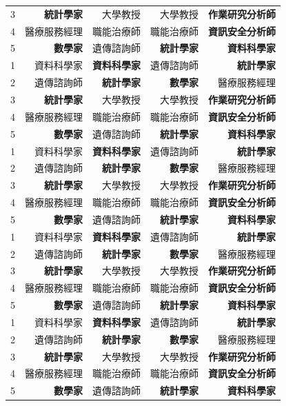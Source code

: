 \documentclass[utf8,12pt]{article} %
\begin{document}
\begin{longtable}{@{}crrrr@{}}
3 & \textbf{統計學家} & 大學教授  & 大學教授 & \textbf{作業研究分析師}\\
4 & 醫療服務經理 & 職能治療師  & 職能治療師 & \textbf{資訊安全分析師} \\
5 & \textbf{數學家} & 遺傳諮詢師 & \textbf{統計學家} & \textbf{資料科學家} \\
1 & { 資料科學家} & \textbf{資料科學家}  &  遺傳諮詢師 & \textbf{統計學家} \\
2 & 遺傳諮詢師 & \textbf{統計學家} & \textbf{數學家}  & 醫療服務經理 \\
3 & \textbf{統計學家} & 大學教授  & 大學教授 & \textbf{作業研究分析師}\\
4 & 醫療服務經理 & 職能治療師  & 職能治療師 & \textbf{資訊安全分析師} \\
5 & \textbf{數學家} & 遺傳諮詢師 & \textbf{統計學家} & \textbf{資料科學家} \\
1 & { 資料科學家} & \textbf{資料科學家}  &  遺傳諮詢師 & \textbf{統計學家} \\
2 & 遺傳諮詢師 & \textbf{統計學家} & \textbf{數學家}  & 醫療服務經理 \\
3 & \textbf{統計學家} & 大學教授  & 大學教授 & \textbf{作業研究分析師}\\
4 & 醫療服務經理 & 職能治療師  & 職能治療師 & \textbf{資訊安全分析師} \\
5 & \textbf{數學家} & 遺傳諮詢師 & \textbf{統計學家} & \textbf{資料科學家} \\
1 & { 資料科學家} & \textbf{資料科學家}  &  遺傳諮詢師 & \textbf{統計學家} \\
2 & 遺傳諮詢師 & \textbf{統計學家} & \textbf{數學家}  & 醫療服務經理 \\
3 & \textbf{統計學家} & 大學教授  & 大學教授 & \textbf{作業研究分析師}\\
4 & 醫療服務經理 & 職能治療師  & 職能治療師 & \textbf{資訊安全分析師} \\
5 & \textbf{數學家} & 遺傳諮詢師 & \textbf{統計學家} & \textbf{資料科學家} \\
1 & { 資料科學家} & \textbf{資料科學家}  &  遺傳諮詢師 & \textbf{統計學家} \\
2 & 遺傳諮詢師 & \textbf{統計學家} & \textbf{數學家}  & 醫療服務經理 \\
3 & \textbf{統計學家} & 大學教授  & 大學教授 & \textbf{作業研究分析師}\\
4 & 醫療服務經理 & 職能治療師  & 職能治療師 & \textbf{資訊安全分析師} \\
5 & \textbf{數學家} & 遺傳諮詢師 & \textbf{統計學家} & \textbf{資料科學家} \\

\end{longtable}
\end{document}
